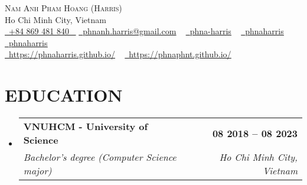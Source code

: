 \documentclass[letterpaper,11pt]{article}
\makeatletter
\newcommand{\resumeSubheading}[4]{
  \vspace{-2pt}\item
    \begin{tabular*}{1.0\textwidth}[t]{l@{\extracolsep{\fill}}r}
      \textbf{\large#1} & \textbf{\small #2} \\
      \textit{\large#3} & \textit{\small #4} \\
      
    \end{tabular*}\vspace{-7pt}
}
\newcommand{\resumeSubHeadingListStart}{\begin{itemize}[leftmargin=0.0in, label={}]}
\newcommand{\resumeSubHeadingListEnd}{\end{itemize}}
\makeatother
\begin{document}


\begin{center}
    {\Huge \scshape Nam Anh Pham Hoang (Harris)} \\ \vspace{1pt}
    Ho Chi Minh City, Vietnam \\ \vspace{1pt}
    \small \href{tel:+84 869 481 840}{ \raisebox{-0.1\height}\faPhone\ \underline{+84 869 481 840} ~}
    \href{mailto:phnanh.harris@gmail.com}{\raisebox{-0.2\height}\faEnvelope\  \underline{phnanh.harris@gmail.com}} ~ 
    \href{https://linkedin.com/in/phna-harris}{\raisebox{-0.2\height}\faLinkedinSquare\ \underline{phna-harris}}  ~
    \href{https://github.com/phnaharris}{\raisebox{-0.2\height}\faGithub\ \underline{phnaharris}} ~
    \href{https://www.hackerrank.com/phnaharris}{\raisebox{-0.2\height}\faHackerrank\ \underline{phnaharris}} \\
    \href{https://phnaharris.github.io/}{\raisebox{-0.2\height}\faGlobe\  \underline{https://phnaharris.github.io/}} ~
    \href{https://phnaphnt.github.io/}{\raisebox{-0.2\height}\faGlobe\  \underline{https://phnaphnt.github.io/}}
    \vspace{-8pt}
\end{center}


\section{EDUCATION}
  \resumeSubHeadingListStart
    \resumeSubheading
      {VNUHCM - University of Science}{08 2018 -- 08 2023}
      {Bachelor's degree (Computer Science major)}{Ho Chi Minh City, Vietnam}
  \resumeSubHeadingListEnd
  

\end{document}
